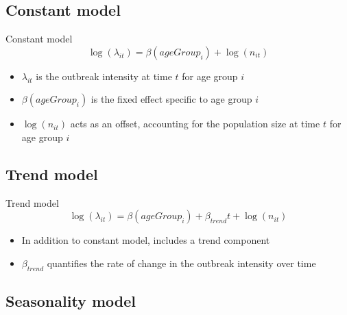 \documentclass[aspectratio=169,handout]{beamer}
\begin{document}
\hypertarget{constant-model}{%
\subsection{Constant model}\label{constant-model}}

\begin{frame}{Constant model}
\begin{equation}\label{eq:Agegroup}
  \log(\lambda_{it}) = \beta(ageGroup_{i}) + \log(n_{it})
\end{equation}

\begin{itemize}
  \item $\lambda_{it}$ is the outbreak intensity at time $t$ for age group $i$
  \item $\beta(ageGroup_{i})$ is the fixed effect specific to age group $i$
  \item $\log(n_{it})$ acts as an offset, accounting for the population size at time $t$ for age group $i$
\end{itemize}
\end{frame}

\hypertarget{trend-model}{%
\subsection{Trend model}\label{trend-model}}

\begin{frame}{Trend model}
\begin{equation}
  \log(\lambda_{it})=\beta(ageGroup_{i}) + \beta_{trend} t + \log(n_{it})
\end{equation}

\begin{itemize}
  \item In addition to constant model, includes a trend component
  \item $\beta_{trend}$ quantifies the rate of change in the outbreak intensity over time
\end{itemize}
\end{frame}

\hypertarget{seasonality-model}{%
\subsection{Seasonality model}\label{seasonality-model}}
\end{document}
